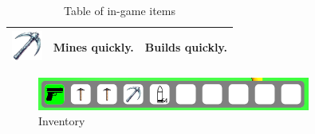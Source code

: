 \begin{table}[h]
\begin{tabular}{|c|p{5cm}|p{5cm}|}
        \hline
        \includegraphics[width=1cm]{chapters/user_manual/resources/pickaxe-fast.png} & Mines quickly.                                                                        & Builds quickly.     \\
        \hline
    \end{tabular}
    \caption{Table of in-game items}
    \label{tab:mytable}
\end{table}

\begin{figure}[H]
    \centering
    \includegraphics[width=0.8\textwidth]{chapters/user_manual/resources/inventory.png}
    \caption{Inventory}
    \label{fig:inventory}
\end{figure}